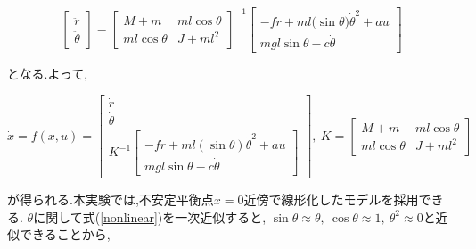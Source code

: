 \documentclass[a4j,11pt,twoside]{jbook}
\begin{document}
$$
    \left[
    \begin{array}{c}
        \ddot{r} \\
        \ddot{\theta}
    \end{array}    
    \right]
    =
    \left[
    \begin{array}{cc}
        M + m           &  ml\cos{\theta} \\
        ml\cos{\theta}  &  J + ml^2
    \end{array}
    \right]^{-1}
    \left[
        \begin{array}{c}
            -f \dot{r} + ml(\sin{\theta)} \dot{\theta}^2 + au \\
            mgl\sin{\theta} - c \dot{\theta}
        \end{array}
    \right]
$$

となる.よって,

\begin{equation}
    \dot x = f(x, u) = 
    \left[
        \begin{array}{c}
            \dot{r} \\
            \dot{\theta} \\
            K^{-1}
            \left[
                \begin{array}{c}
                    -f \dot{r} + ml(\sin{\theta}) \dot{\theta}^2 + au \\
                    mgl\sin{\theta} - c \dot{\theta}
                \end{array}
            \right]
        \end{array}    
    \right],\
    K = 
    \left[
        \begin{array}{cc}
            M + m           &  ml\cos{\theta} \\
            ml\cos{\theta}  &  J + ml^2
        \end{array}
    \right]
    \label{nonlinear}
\end{equation}

が得られる.本実験では,不安定平衡点$x=0$近傍で線形化したモデルを採用できる.
$\theta$に関して式(\ref{nonlinear})を一次近似すると,
$\sin{\theta} \approx \theta,\ \cos{\theta} \approx 1,\ \theta^2 \approx 0$と近似できることから,
\end{document}

